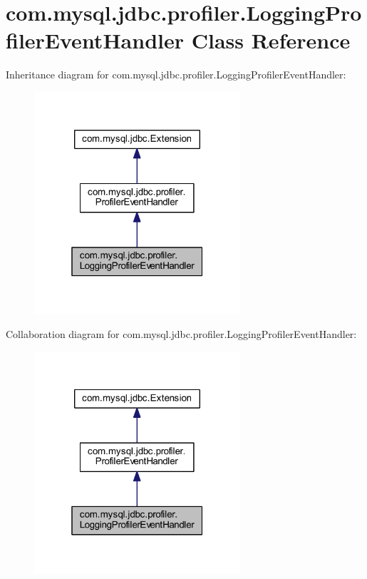 \hypertarget{classcom_1_1mysql_1_1jdbc_1_1profiler_1_1_logging_profiler_event_handler}{}\section{com.\+mysql.\+jdbc.\+profiler.\+Logging\+Profiler\+Event\+Handler Class Reference}
\label{classcom_1_1mysql_1_1jdbc_1_1profiler_1_1_logging_profiler_event_handler}


Inheritance diagram for com.\+mysql.\+jdbc.\+profiler.\+Logging\+Profiler\+Event\+Handler\+:
\nopagebreak
\begin{figure}[H]
\begin{center}
\leavevmode
\includegraphics[width=217pt]{classcom_1_1mysql_1_1jdbc_1_1profiler_1_1_logging_profiler_event_handler__inherit__graph}
\end{center}
\end{figure}


Collaboration diagram for com.\+mysql.\+jdbc.\+profiler.\+Logging\+Profiler\+Event\+Handler\+:
\nopagebreak
\begin{figure}[H]
\begin{center}
\leavevmode
\includegraphics[width=217pt]{classcom_1_1mysql_1_1jdbc_1_1profiler_1_1_logging_profiler_event_handler__coll__graph}
\end{center}
\end{figure}

